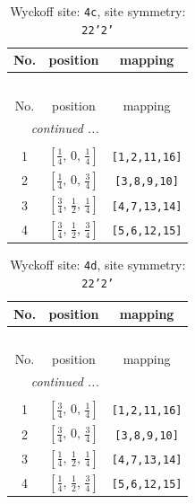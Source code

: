 \documentclass[fleqn,8pt]{jsarticle}
\begin{document}
\renewcommand{\arraystretch}{1.2}
\begin{longtable}{ccc}
\caption{Wyckoff site: {\tt 4c}, site symmetry: {\tt 22'2'}}
 \\
 \hline \hline
No. & position & mapping \\ \hline \endfirsthead

\multicolumn{2}{l}{\tablename\ \thetable{}} \\
 \hline \hline
No. & position & mapping \\ \hline \endhead

 \hline \hline
\multicolumn{2}{r}{\footnotesize\it continued ...} \\ \endfoot

 \hline \hline
\multicolumn{2}{r}{} \\ \endlastfoot

1 & $\left[ \frac{1}{4},\, 0,\, \frac{1}{4} \right]$ & {\tt [1,2,11,16]} \\ \hline
2 & $\left[ \frac{1}{4},\, 0,\, \frac{3}{4} \right]$ & {\tt [3,8,9,10]} \\ \hline
3 & $\left[ \frac{3}{4},\, \frac{1}{2},\, \frac{1}{4} \right]$ & {\tt [4,7,13,14]} \\ \hline
4 & $\left[ \frac{3}{4},\, \frac{1}{2},\, \frac{3}{4} \right]$ & {\tt [5,6,12,15]} \\
\end{longtable}
\renewcommand{\arraystretch}{1.2}
\begin{longtable}{ccc}
\caption{Wyckoff site: {\tt 4d}, site symmetry: {\tt 22'2'}}
 \\
 \hline \hline
No. & position & mapping \\ \hline \endfirsthead

\multicolumn{2}{l}{\tablename\ \thetable{}} \\
 \hline \hline
No. & position & mapping \\ \hline \endhead

 \hline \hline
\multicolumn{2}{r}{\footnotesize\it continued ...} \\ \endfoot

 \hline \hline
\multicolumn{2}{r}{} \\ \endlastfoot

1 & $\left[ \frac{3}{4},\, 0,\, \frac{1}{4} \right]$ & {\tt [1,2,11,16]} \\ \hline
2 & $\left[ \frac{3}{4},\, 0,\, \frac{3}{4} \right]$ & {\tt [3,8,9,10]} \\ \hline
3 & $\left[ \frac{1}{4},\, \frac{1}{2},\, \frac{1}{4} \right]$ & {\tt [4,7,13,14]} \\ \hline
4 & $\left[ \frac{1}{4},\, \frac{1}{2},\, \frac{3}{4} \right]$ & {\tt [5,6,12,15]} \\
\end{longtable}
\end{document}

